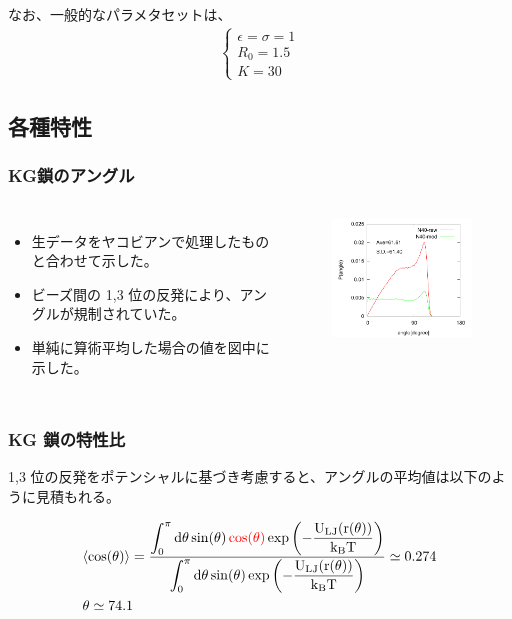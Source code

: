 \documentclass[11pt, dvipdfmx]{beamer}
\begin{document}
\begin{appendix}
\begin{frame}
なお、一般的なパラメタセットは、
\begin{align*}
 \begin{cases}
	\epsilon = \sigma = 1 \\
	R_0 = 1.5 \\
	K=30
 \end{cases}
\end{align*}
\end{frame}

\subsection{各種特性}
\begin{frame}
\frametitle{KG鎖のアングル}

\begin{columns}[totalwidth=1\textwidth]
\footnotesize
\begin{itemize}
\item
生データをヤコビアンで処理したものと合わせて示した。
\item
ビーズ間の 1,3 位の反発により、アングルが規制されていた。
\item
単純に算術平均した場合の値を図中に示した。
\end{itemize}


\begin{figure}
\centering
\includegraphics[width=60mm]{./fig/Angle_N40.pdf}
\end{figure}
\end{columns}

\end{frame}


\begin{frame}
\frametitle{KG 鎖の特性比}

\footnotesize
1,3 位の反発をポテンシャルに基づき考慮すると、アングルの平均値は以下のように見積もれる。

\begin{align*}
&\langle \cos (\theta) \rangle 
= \dfrac{
\displaystyle \int_0^{\pi} \rm{d} \theta 
\sin(\theta) 
\color{red}
\cos(\theta)
\color{black} 
\exp \left(-\dfrac{U_{LJ}(r(\theta))}{k_B T}\right)
}
{\displaystyle \int_0^{\pi} \rm{d} \theta 
\sin(\theta) \exp \left(-\dfrac{U_{LJ}(r(\theta))}{k_B T}\right)}
\simeq 0.274 \notag \\
&\theta \simeq 74.1
\end{align*}


\end{frame}
\end{appendix}
\end{document}
